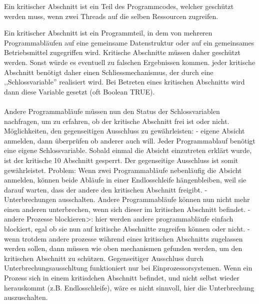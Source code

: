\begin{answer}
Ein kritischer Abschnitt ist ein Teil des Programmcodes, welcher geschützt werden muss, wenn zwei Threads auf die selben Ressourcen zugreifen.

Ein kritischer Abschnitt ist ein Programmteil, in dem von mehreren Programmabläufen auf eine gemeinsame
Datenstruktur oder auf ein gemeinsames Betriebsmittel zugegriffen wird. Kritische Abschnitte müssen daher geschützt werden. Sonst würde es eventuell zu falschen Ergebnissen kommen. jeder kritische Abschnitt benötigt daher einen Schliessmechanismus, der durch eine ,,Schlossvariable'' realisiert wird. Bei Betreten eines kritischen Abschnitts wird dann diese Variable gesetzt (oft Boolean TRUE).

\paragraph*{}
Andere Programmabläufe müssen nun den Status der Schlossvariablen nachfragen,
um zu erfahren, ob der kritische Abschnitt frei ist oder nicht.
Möglichkeiten, den gegenseitigen Ausschluss zu gewährleisten:
- eigene Absicht anmelden, dann überprüfen ob anderer auch will. Jeder Programmablauf benötigt
eine eigene Schlossvariable. Sobald einmal die Absicht einzutreten erklärt wurde, ist der kritische
10
Abschnitt gesperrt. Der gegenseitige Ausschluss ist somit gewährleistet.
Problem: Wenn zwei Programmabläufe nebenläufig die Absicht anmelden, können beide Abläufe
in einer Endlosschleife hängenbleiben, weil sie darauf warten, dass der andere den kritischen Abschnitt
freigibt.
- Unterbrechungen ausschalten. Andere Programmabläufe können nun nicht mehr einen anderen
unterbrechen, wenn sich dieser im kritischen Abschnitt befindet.
- andere Prozesse blockieren>: hier werden andere programmabläufe einfach blockiert, egal ob sie
nun auf kritische Abschnitte zugreifen können oder nicht.
- wenn trotdem andere prozesse während eines kritischen Abschnitts zugelassen werden sollen,
dann müssen wie oben mechanismen gefunden werden, um den kritischen Abschnitt zu schützen.
Gegenseitiger Ausschluss durch Unterbrechungsausschltung funktioniert nur bei Einprozessorsystemen.
Wenn ein Prozess sich in einem kritisdchen Abschnitt befindet, und nicht selbst wieder
herauskommt (z.B. Endlosschleife), wäre es nicht sinnvoll, hier die Unterbrechung auszuschalten.
\end{answer}

